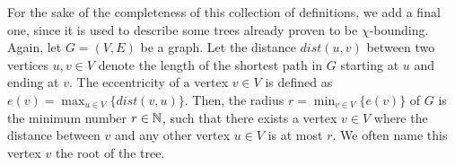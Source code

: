 For the sake of the completeness of this collection of definitions, we add a final one, since it is used to describe some trees already proven to be $\chi$-bounding. Again, let $G=(V,E)$ be a graph. Let the distance $dist(u,v)$ between two vertices $u,v\in V$ denote the length of the shortest path in $G$ starting at $u$ and ending at $v$. The eccentricity of a vertex $v\in V$ is defined as $\displaystyle e(v)=\max_{u \in V}\lbrace dist(v,u)\rbrace$. Then, the radius $\displaystyle r= \min_{v\in V}\lbrace e(v)\rbrace$ of $G$ is the minimum number $r\in\mathbb{N}$, such that there exists a vertex $v\in V$ where the distance between $v$ and any other vertex $u\in V$ is at most $r$. We often name this vertex $v$ the root of the tree.
